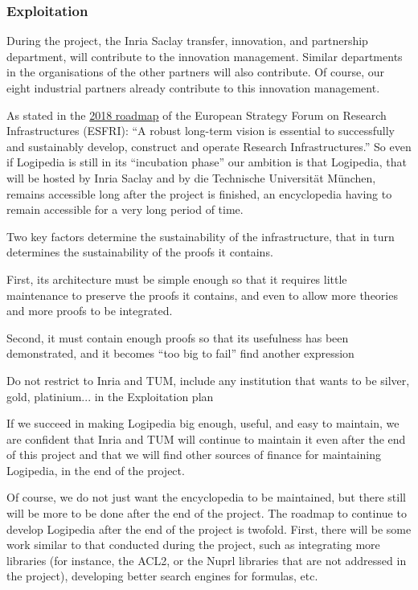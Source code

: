 \subsubsection*{Exploitation}

During the project, the Inria Saclay transfer, innovation, and
partnership department, will contribute to the innovation management.
Similar departments in the organisations  of the other partners will 
also contribute. Of course, our eight industrial partners already 
contribute to this innovation management.

As stated in the \href{http://roadmap2018.esfri.eu/media/1048/rm2018-part1-20.pdf}{2018 roadmap} of the
European Strategy Forum on Research Infrastructures (ESFRI): ``A robust
long-term vision is essential to successfully and sustainably develop,
construct and operate Research Infrastructures.'' So even if
Logipedia is still in its ``incubation phase'' our ambition is that
Logipedia, that will be hosted by Inria Saclay and by die Technische
Universität München, remains accessible long after the project is
finished, an encyclopedia having to remain accessible for a very long
period of time.

Two key factors determine the sustainability of the infrastructure,
that in turn determines the sustainability of the proofs it contains.
\begin{compactitem}
\item First, its architecture must be simple enough so that it requires
  little maintenance to preserve the proofs it contains, and even to
  allow more theories and more proofs to be integrated.
\item Second, it must contain enough proofs so that its usefulness has been
  demonstrated, and it becomes ``too big to fail''
  {\color{red} find another expression}

  {\color{red} Do not restrict to Inria and TUM, include any institution that wants to be
  silver, gold, platinium... in the Exploitation plan}

  
\end{compactitem}

If we succeed in making Logipedia big enough, useful, and easy to
maintain, we are confident that Inria and TUM will continue to
maintain it even after the end of this project and that we will find
other sources of finance for maintaining Logipedia, in the end of the
project.

Of course, we do not just want the encyclopedia to be maintained, but
there still will be more to be done after the end of the project. The
roadmap to continue to develop Logipedia after the end of the project
is twofold. First, there will be some work similar to that conducted
during the project, such as integrating more libraries (for instance,
the ACL2, or the Nuprl libraries that are not addressed in the
project), developing better search engines for formulas, etc.

